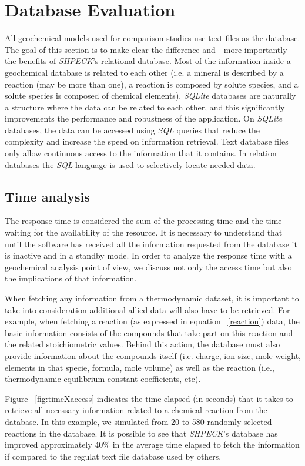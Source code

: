 \section{Database Evaluation}
All geochemical models used for comparison studies use text files as the database. The goal of this section is to make clear the difference and - more importantly - the benefits of \emph{SHPECK}'s relational database. Most of the information inside a geochemical database is related to each other (i.e. a mineral is described by a reaction (may be more than one), a reaction is composed by solute species, and a solute species is composed of chemical elements). \emph{SQLite} databases are naturally a structure where the data can be related to each other, and this significantly improvements the performance and robustness of the application. On \emph{SQLite} databases, the data can be accessed using \emph{SQL} queries that reduce the complexity and increase the speed on information retrieval. Text database files only allow continuous access to the information that it contains. In relation databases the \emph{SQL} language is used to selectively locate needed data. 

\subsection{Time analysis}
The response time is considered the sum of the processing time and the time waiting for the availability of the resource. It is necessary to understand that until the software has received all the information requested from the database it is inactive and in a standby mode. In order to analyze the response time with a geochemical analysis point of view, we discuss not only the access time but also the implications of that information.

When fetching any information from a thermodynamic dataset, it is important to take into consideration additional allied data will also have to be retrieved. For example, when fetching a reaction (as expressed in equation ~\ref{reaction}) data, the basic information consists of the compounds that take part on this reaction and the related stoichiometric values. Behind this action, the database must also provide information about the compounds itself (i.e. charge, ion size, mole weight, elements in that specie, formula, mole volume) as well as the reaction (i.e., thermodynamic equilibrium constant coefficients, etc).

Figure ~\ref{fig:timeXaccess} indicates the time elapsed (in seconds) that it takes to retrieve all necessary information related to a chemical reaction from the database. In this example, we simulated from 20 to 580 randomly selected reactions in the database. It is possible to see that \emph{SHPECK}'s database has improved approximately 40\% in the average time elapsed to fetch the information if compared to the regulat text file database used by others.

